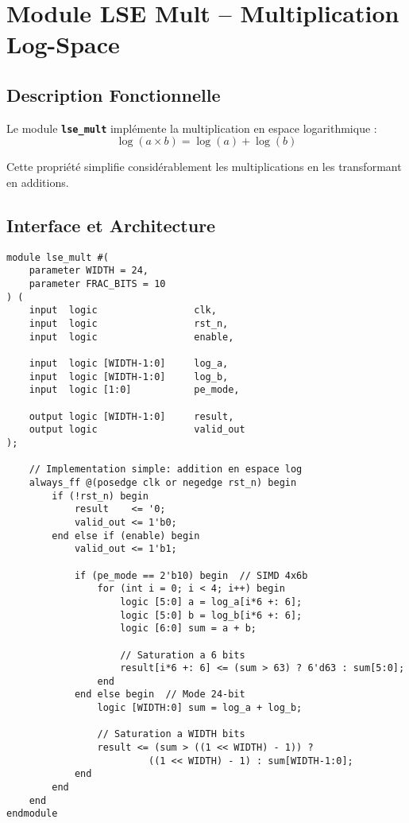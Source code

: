 \documentclass[12pt,a4paper]{article}
\newcommand{\module}[1]{\textbf{\texttt{#1}}}
\begin{document}
\section{Module LSE Mult -- Multiplication Log-Space}

\subsection{Description Fonctionnelle}

Le module \module{lse\_mult} implémente la multiplication en espace logarithmique :
\begin{equation}
\log(a \times b) = \log(a) + \log(b)
\end{equation}

Cette propriété simplifie considérablement les multiplications en les transformant en additions.

\subsection{Interface et Architecture}

\begin{lstlisting}[style=verilog, caption={Module lse\_mult.sv}]
module lse_mult #(
    parameter WIDTH = 24,
    parameter FRAC_BITS = 10
) (
    input  logic                 clk,
    input  logic                 rst_n,
    input  logic                 enable,
    
    input  logic [WIDTH-1:0]     log_a,
    input  logic [WIDTH-1:0]     log_b,
    input  logic [1:0]           pe_mode,
    
    output logic [WIDTH-1:0]     result,
    output logic                 valid_out
);

    // Implementation simple: addition en espace log
    always_ff @(posedge clk or negedge rst_n) begin
        if (!rst_n) begin
            result    <= '0;
            valid_out <= 1'b0;
        end else if (enable) begin
            valid_out <= 1'b1;
            
            if (pe_mode == 2'b10) begin  // SIMD 4x6b
                for (int i = 0; i < 4; i++) begin
                    logic [5:0] a = log_a[i*6 +: 6];
                    logic [5:0] b = log_b[i*6 +: 6];
                    logic [6:0] sum = a + b;
                    
                    // Saturation a 6 bits
                    result[i*6 +: 6] <= (sum > 63) ? 6'd63 : sum[5:0];
                end
            end else begin  // Mode 24-bit
                logic [WIDTH:0] sum = log_a + log_b;
                
                // Saturation a WIDTH bits
                result <= (sum > ((1 << WIDTH) - 1)) ? 
                         ((1 << WIDTH) - 1) : sum[WIDTH-1:0];
            end
        end
    end
endmodule
\end{lstlisting}
\end{document}
